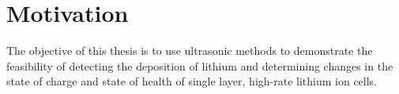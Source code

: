 \section{Motivation}
The objective of this thesis is to use ultrasonic methods to demonstrate the feasibility of detecting the deposition of lithium and determining changes in the state of charge and state of health of single layer, high-rate lithium ion cells.